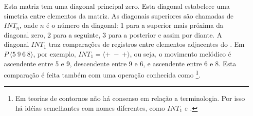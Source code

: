 \begin{table}
  \centering
  \qquad
  \qquad
  \caption{Exemplos de }
  \label{tab:matriz-exemplos}
\end{table}

Esta matriz tem uma diagonal principal zero. Esta diagonal estabelece
uma simetria entre elementos da matriz. As diagonais superiores são
chamadas de $INT_n$, onde $n$ é o número da diagonal: 1 para a
superior mais próxima da diagonal zero, 2 para a seguinte, 3 para a
posterior e assim por diante. A diagonal $INT_1$ traz comparações de
registros entre elementos adjacentes do . Em
$P\:\langle5\:9\:6\:8\rangle$, por exemplo,
$INT_1=\langle+\:-\:+\rangle$, ou seja, o movimento melódico é
ascendente entre 5 e 9, descendente entre 9 e 6, e ascendente entre 6
e 8. Esta comparação é feita também com uma operação conhecida como
 \footnote{Em teorias de contornos não há consenso em
  relação a terminologia. Por isso há idéias semelhantes com nomes
  diferentes, como $INT_1$ e 
  \cite{friedmann87:response}.}.

